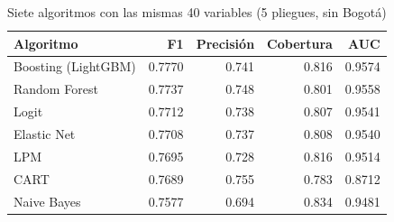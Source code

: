 \begin{table}[ht]
\centering
\begin{tabular}{lrrrr}
  \hline
Algoritmo & F1 & Precisión & Cobertura & AUC \\ 
  \hline
Boosting (LightGBM) & 0.7770 & 0.741 & 0.816 & 0.9574 \\ 
  Random Forest & 0.7737 & 0.748 & 0.801 & 0.9558 \\ 
  Logit & 0.7712 & 0.738 & 0.807 & 0.9541 \\ 
  Elastic Net & 0.7708 & 0.737 & 0.808 & 0.9540 \\ 
  LPM & 0.7695 & 0.728 & 0.816 & 0.9514 \\ 
  CART & 0.7689 & 0.755 & 0.783 & 0.8712 \\ 
  Naive Bayes & 0.7577 & 0.694 & 0.834 & 0.9481 \\ 
   \hline
\end{tabular}
\caption{Siete algoritmos con las mismas 40 variables (5 pliegues, sin Bogotá)} 
\end{table}
